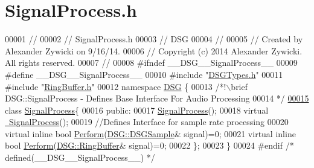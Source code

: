\hypertarget{_signal_process_8h_source}{\section{Signal\+Process.\+h}
\label{_signal_process_8h_source}
}

\begin{DoxyCode}
00001 \textcolor{comment}{//}
00002 \textcolor{comment}{//  SignalProcess.h}
00003 \textcolor{comment}{//  DSG}
00004 \textcolor{comment}{//}
00005 \textcolor{comment}{//  Created by Alexander Zywicki on 9/16/14.}
00006 \textcolor{comment}{//  Copyright (c) 2014 Alexander Zywicki. All rights reserved.}
00007 \textcolor{comment}{//}
00008 \textcolor{preprocessor}{#ifndef \_\_DSG\_\_SignalProcess\_\_}
00009 \textcolor{preprocessor}{#define \_\_DSG\_\_SignalProcess\_\_}
00010 \textcolor{preprocessor}{#include "\hyperlink{_d_s_g_types_8h}{DSGTypes.h}"}
00011 \textcolor{preprocessor}{#include "\hyperlink{_ring_buffer_8h}{RingBuffer.h}"}
00012 \textcolor{keyword}{namespace }\hyperlink{namespace_d_s_g}{DSG} \{\textcolor{comment}{}
00013 \textcolor{comment}{    /*!\(\backslash\)brief DSG::SignalProcess - Defines Base Interface For Audio Processing}
00014 \textcolor{comment}{     */}
\hypertarget{_signal_process_8h_source_l00015}{}\hyperlink{class_d_s_g_1_1_signal_process}{00015}     \textcolor{keyword}{class }\hyperlink{class_d_s_g_1_1_signal_process}{SignalProcess}\{
00016     \textcolor{keyword}{public}:
00017         \hyperlink{class_d_s_g_1_1_signal_process_a3fd4347483bcf3cc0a3d7bf98ff56218}{SignalProcess}();
00018         \textcolor{keyword}{virtual} \hyperlink{class_d_s_g_1_1_signal_process_ad9b6a758241a092ddc38e13effc9553f}{~SignalProcess}();
00019         \textcolor{comment}{//Defines Interface for sample rate processing}
00020         \textcolor{keyword}{virtual} \textcolor{keyword}{inline} \textcolor{keywordtype}{bool} \hyperlink{class_d_s_g_1_1_signal_process_af73d246c460915db7a9be7e3ef36844d}{Perform}(\hyperlink{namespace_d_s_g_ac39a94cd27ebcd9c1e7502d0c624894a}{DSG::DSGSample}& signal)=0;
00021         \textcolor{keyword}{virtual} \textcolor{keyword}{inline} \textcolor{keywordtype}{bool} \hyperlink{class_d_s_g_1_1_signal_process_af73d246c460915db7a9be7e3ef36844d}{Perform}(\hyperlink{class_d_s_g_1_1_ring_buffer}{DSG::RingBuffer}& signal)=0;
00022     \};
00023 \}
00024 \textcolor{preprocessor}{#endif }\textcolor{comment}{/* defined(\_\_DSG\_\_SignalProcess\_\_) */}\textcolor{preprocessor}{}
\end{DoxyCode}
